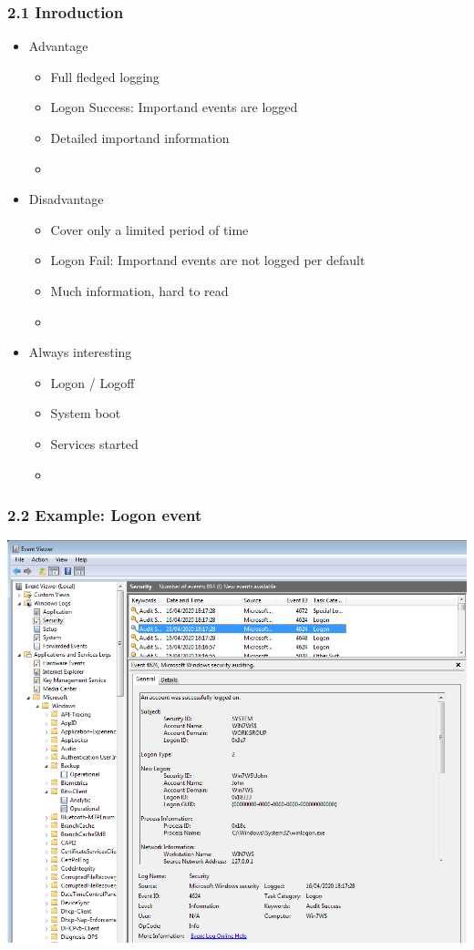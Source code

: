 \begin{frame}[fragile]
  \frametitle{2.1 Inroduction}
    \begin{itemize}
        \item Advantage
            \begin{itemize}
                \item Full fledged logging
                \item Logon Success: Importand events are logged
                \item Detailed importand information
		\item[] 
            \end{itemize}
        \item Disadvantage
            \begin{itemize}
                \item Cover only a limited period of time
                \item Logon Fail: Importand events are not logged per default
                \item Much information, hard to read
		\item[]
            \end{itemize}
        \item Always interesting
            \begin{itemize}
                \item Logon / Logoff
                \item System boot
                \item Services started
		\item[]
            \end{itemize}
    \end{itemize}
\end{frame}


\begin{frame}[fragile]
  \frametitle{2.2 Example: Logon event}
    \includegraphics[scale=0.24]{images/evtx.png}
\end{frame}


